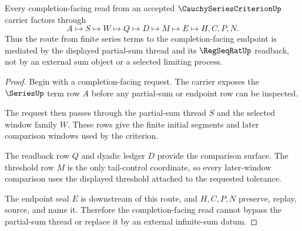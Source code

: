 \begin{theorem}\label{thm:cauchy-series-criterion-partial-sum-thread}
Every completion-facing read from an accepted $\CauchySeriesCriterionUp$ carrier factors through
$$
A \longmapsto S \longmapsto W \longmapsto Q \longmapsto D \longmapsto M \longmapsto E \longmapsto H,C,P,N .
$$
Thus the route from finite series terms to the completion-facing endpoint is mediated by the displayed partial-sum thread and its $\RegSeqRatUp$ readback, not by an external sum object or a selected limiting process.
\end{theorem}
\begin{proof}
Begin with a completion-facing request. The carrier exposes the $\SeriesUp$ term row $A$ before any partial-sum or endpoint row can be inspected.

The request then passes through the partial-sum thread $S$ and the selected window family $W$. These rows give the finite initial segments and later comparison windows used by the criterion.

The readback row $Q$ and dyadic ledger $D$ provide the comparison surface. The threshold row $M$ is the only tail-control coordinate, so every later-window comparison uses the displayed threshold attached to the requested tolerance.

The endpoint seal $E$ is downstream of this route, and $H,C,P,N$ preserve, replay, source, and name it. Therefore the completion-facing read cannot bypass the partial-sum thread or replace it by an external infinite-sum datum.
\end{proof}

